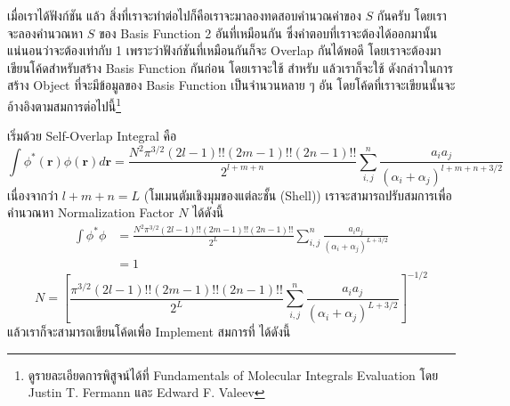 \vspace{5pt}

เมื่อเราได้ฟังก์ชัน  แล้ว สิ่งที่เราจะทำต่อไปก็คือเราจะมาลองทดสอบคำนวณค่าของ $S$ กันครับ โดยเราจะลองคำนวณหา $S$ ของ Basis Function 2 อันที่เหมือนกัน ซึ่งคำตอบที่เราจะต้องได้ออกมานั้นแน่นอนว่าจะต้องเท่ากับ 1 เพราะว่าฟังก์ชันที่เหมือนกันก็จะ Overlap กันได้พอดี โดยเราจะต้องมาเขียนโค้ดสำหรับสร้าง Basis Function กันก่อน โดยเราจะใช้  สำหรับ  แล้วเราก็จะใช้  ดังกล่าวในการสร้าง Object ที่จะมีข้อมูลของ  Basis Function เป็นจำนวนหลาย ๆ อัน โดยโค้ดที่เราจะเขียนนั้นจะอ้างอิงตามสมการต่อไปนี้\footnote{ดูรายละเอียดการพิสูจน์ได้ที่ Fundamentals of Molecular Integrals Evaluation โดย Justin T. Fermann และ Edward F. Valeev\autocite{fermann2020}}

เริ่มด้วย Self-Overlap Integral คือ
%
\begin{equation}
  \int \phi^*(\mathbf{r}) \phi(\mathbf{r}) d \mathbf{r}
  =
  \frac{N^2 \pi^{3 / 2}(2 l-1) ! !(2 m-1) ! !(2 n-1) ! !}{2^{l+m+n}}
  \sum_{i, j}^n \frac{a_i a_j}{\left(\alpha_i+\alpha_j\right)^{l+m+n+3 / 2}}
\end{equation}
%
เนื่องจากว่า $l + m + n = L$ (โมเมนตัมเชิงมุมของแต่ละชั้น (Shell)) เราจะสามารถปรับสมการเพื่อคำนวณหา Normalization
Factor $N$ ได้ดังนี้
%
\begin{align}
  \int \phi^* \phi
   & =
  \frac{N^2 \pi^{3 / 2}(2 l-1) ! !(2 m-1) ! !(2 n-1) ! !}{2^L}
  \sum_{i, j}^n \frac{a_i a_j}{\left(\alpha_i+\alpha_j\right)^{L+3 / 2}} \\
   & =
  1
\end{align}
%
\begin{equation}
  N
  =
  \left[
    \frac{\pi^{3 / 2}(2 l-1) ! !(2 m-1) ! !(2 n-1) ! !}{2^L}
    \sum_{i, j}^n \frac{a_i a_j}{\left(\alpha_i+\alpha_j\right)^{L+3 / 2}}
    \right]^{-1 / 2}
\end{equation}
%
แล้วเราก็จะสามารถเขียนโค้ดเพื่อ Implement สมการที่ ได้ดังนี้

\vspace{5pt}


